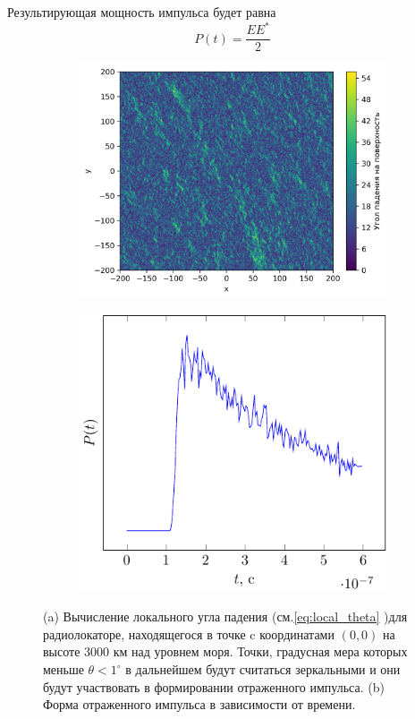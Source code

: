  Результирующая мощность импульса будет равна
 \begin{equation}
     P(t) = \frac{EE^*}{2}
 \end{equation}
 \begin{figure}[h]
     \begin{subfigure}{.55\linewidth}
         \centering
         \includegraphics[width=\linewidth]{img/theta0}
         \caption{}
     \end{subfigure}
     \hfill
     \begin{subfigure}{.45\linewidth}
         \centering
         \includegraphics[width=\linewidth]{fig/theta}
         \caption{}
     \end{subfigure}
     \caption{(a) Вычисление локального угла падения (см.\eqref{eq:local_theta} )для радиолокаторе,
     находящегося в точке c координатами $(0,0)$ на высоте 3000 км над уровнем
     моря.  Точки, градусная мера которых меньше
     $\theta<1^\circ$ в 
 дальнейшем будут считаться зеркальными и они будут участвовать в
 формировании отраженного импульса.
 (b) Форма отраженного импульса в зависимости от времени.}
    \label{fig:model_impuls}
 \end{figure}


